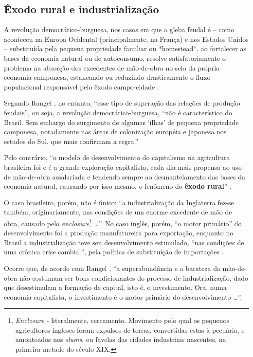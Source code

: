 \documentclass[
	12pt,				%
	oneside,			%
	a4paper,			%
	chapter=TITLE,		%
	section=TITLE,		%
	english,			%
	brazil				%
	]{abntex2}
\begin{document}
\subsection{Êxodo rural e
industrialização}\label{uxeaxodo-rural-e-industrializauxe7uxe3o}
\begin{citacao}
A revolução democrático-burguesa, nos casos em que a gleba feudal é -- como
aconteceu na Europa Ocidental (principalmente, na França) e nos Estados Unidos
-- substituída pela pequena propriedade familiar ou *homestead*, ao fortalecer
as bases da economia natural ou de autoconsumo, resolve satisfatoriamente o
problema na absorção dos excedentes de mão-de-obra no seio da própria economia
camponesa, estancando ou reduzindo drasticamente o fluxo populacional
responsável pelo êxodo campo-cidade \cite[p.~133]{rangel1986b}. 
\end{citacao}
Segundo Rangel \autocite*[133]{rangel1986b}, no entanto, ``esse tipo de
superação das relações de produção feudais'', ou seja, a revolução
democrático-burguesa, ``não é característico do Brasil. Sem embargo do
surgimento de algumas `ilhas' de pequena propriedade camponesa,
notadamente nas áreas de colonização européia e japonesa nos estados do
Sul, que mais confirmam a regra.''

Pelo contrário, ``o modelo de desenvolvimento do capitalismo na
agricultura brasileira foi e é a grande exploração capitalista, cada dia
mais propensa ao uso de mão-de-obra assalariada e tendendo sempre ao
desmantelamento das bases da economia natural, causando por isso mesmo,
o fenômeno do \textbf{êxodo rural}'' \autocite[134, grifo
nosso]{rangel1986b}.

O caso brasileiro, porém, não é único: ``a industrialização da
Inglaterra fez-se também, originariamente, nas condições de um enorme
excedente de mão de obra, causado pelo \emph{enclosure}\footnote{\emph{Enclosure}
  - literalmente, cercamento. Movimento pelo qual os pequenos
  agricultores ingleses foram expulsos de terras, convertidas estas à
  pecuária, e amontoados nos \emph{slums}, ou favelas das cidades
  industriais nascentes, na primeira metade do século XIX.} \ldots{}''.
No caso inglês, porém, ``o motor primário'' do desenvolvimento foi a
produção manufatureira para exportação, enquanto no Brasil a
industrialização teve seu desenvolvimento estimulado, ``nas condições de
uma crônica crise cambial'', pela política de substituição de
importações \autocite[43-44]{rangel1962}.

Ocorre que, de acordo com Rangel \autocite*[134]{rangel1986b}, ``a
superabundância e a barateza da mão-de-obra não costumam ser bons
condicionantes do processo de industrialização, dado que desestimulam a
formação de capital, isto é, o investimento. Ora, numa economia
capitalista, o investimento é o motor primário do desenvolvimento
\ldots{}''.
\end{document}
